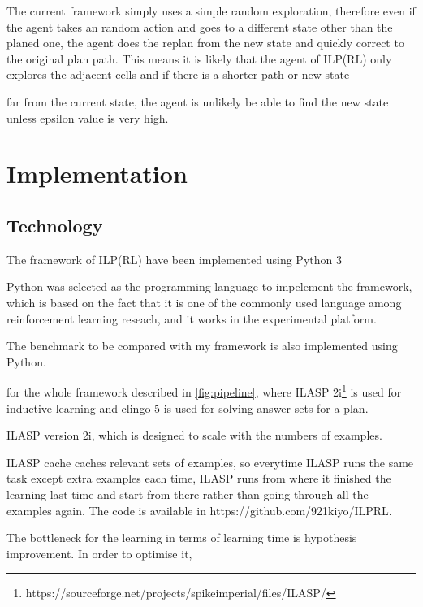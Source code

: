 The current framework simply uses a simple random exploration, therefore even if the agent takes an random action and goes to a different state other than the planed one, 
the agent does the replan from the new state and quickly correct to the original plan path. This means it is likely that the agent of ILP(RL) only explores the adjacent cells and if there is a shorter path or new state

far from the current state, the agent is unlikely be able to find the new state unless epsilon value is very high. 


\section{Implementation}
\label{Implementation}


\subsection{Technology}
The framework of ILP(RL) have been implemented using Python 3

Python was selected as the programming language to impelement the framework, which is based on the fact that it is one of the commonly used language among reinforcement learning reseach, 
and it works in the experimental platform. 

The benchmark to be compared with my framework is also implemented using Python.

for the whole framework described in \ref{fig:pipeline}, where ILASP 2i\footnote{https://sourceforge.net/projects/spikeimperial/files/ILASP/} is used for inductive learning and clingo 5 is used for solving answer sets for a plan.

ILASP version 2i, which is designed to scale with the numbers of examples.

ILASP cache caches relevant sets of examples, so everytime ILASP runs the same task except extra examples each time, ILASP runs from where it finished the learning last time and start from there rather than going through all the examples again.
The code is available in https://github.com/921kiyo/ILPRL.

The bottleneck for the learning in terms of learning time is hypothesis improvement. In order to optimise it,


